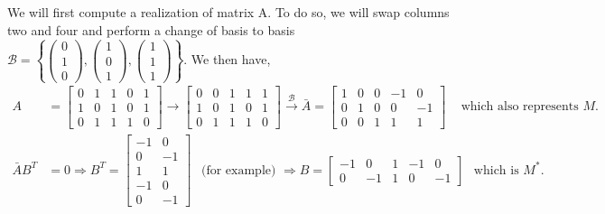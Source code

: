 \documentclass[a4paper, 10pt]{article}
\theoremstyle{definition} %
\begin{document}
We will first compute a realization of matrix A.
To do so, we will swap columns two and four and perform a change of basis to basis $\mathcal{B} = \left\lbrace \left( \begin{array}{c} 0 \\ 1 \\ 0 \end{array} \right), \left( \begin{array}{c} 1 \\ 0 \\ 1 \end{array} \right), \left( \begin{array}{c} 1 \\ 1 \\ 1 \end{array} \right) \right\rbrace$. We then have,
\begin{equation*}
    \begin{split}
        A & = \left[
            \begin{array}{ccccc}
                0 & 1 & 1 & 0 & 1 \\
                1 & 0 & 1 & 0 & 1 \\
                0 & 1 & 1 & 1 & 0
            \end{array}
        \right]
        \longrightarrow
        \left[
            \begin{array}{ccccc}
                0 & 0 & 1 & 1 & 1 \\
                1 & 0 & 1 & 0 & 1 \\
                0 & 1 & 1 & 1 & 0
            \end{array}
        \right]
        \overset{\mathcal{B}}{\longrightarrow}
        \bar{A} = \left[
            \begin{array}{ccccc}
                1 & 0 & 0 & -1 & 0 \\
                0 & 1 & 0 & 0 & -1 \\
                0 & 0 & 1 & 1 & 1
            \end{array}
        \right]
        \hspace{10pt} \text{ which also represents $M$.} \\[10pt]
        \bar{A}B^T & = 0 \Longrightarrow 
        B^T = \left[
            \begin{array}{cc}
                -1 & 0  \\
                0  & -1 \\
                1  & 1 \\
                -1 & 0 \\
                0 & -1
            \end{array}
        \right] \hspace{5pt} \text{ (for example) } \Longrightarrow
        B = \left[
            \begin{array}{ccccc}
                -1 & 0 & 1 & -1 & 0 \\
                0 & -1 & 1 & 0 & -1
            \end{array} 
        \right] \hspace{5pt} \text{ which is $M^*$.}
    \end{split}
\end{equation*}
\end{document}
